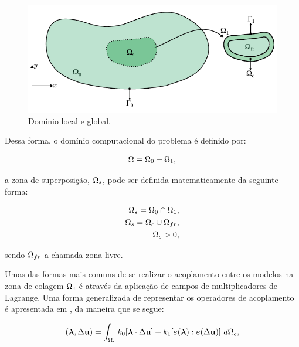 \documentclass[tese_patricia]{subfiles}
\begin{document}
\begin{figure}[htb!]
	\centering 
	\includegraphics[scale=1.0,trim=0cm 0cm 0cm 0.0cm, clip=true]{Imagens/Cap6/dominioArlequin.pdf}	
	\caption{Domínio local e global.}
	\label{fig:DomLocalGlobal}
\end{figure}

Dessa forma, o domínio computacional do problema é definido por:

\begin{align}
	\Omega = \Omega_0 + \Omega_1, 
\end{align}

\noindent a zona de superposição, $\Omega_s$, pode ser definida matematicamente da seguinte forma:

\begin{align}
	\Omega_s = \Omega_0 \cap \Omega_1, \\
	\Omega_s = \Omega_c \cup \Omega_{fr}, \\
	\Omega_s > 0, 
\end{align}

\noindent sendo  $\Omega_{fr}$ a chamada zona livre.

Umas das formas mais comuns de se realizar o acoplamento entre os modelos na zona de colagem $\Omega_c$ é através da aplicação de campos de multiplicadores de Lagrange. Uma forma generalizada de representar os operadores de acoplamento é apresentada em , da maneira que se segue:

\begin{align}
	(\boldsymbol{\lambda},\Delta \mathbf{u}) =  \int_{\Omega_c} k_{0}[\boldsymbol{\lambda} \cdot \Delta \mathbf{u} ] + k_{1}[\bm{\varepsilon} (\boldsymbol{\lambda}) : \bm{\varepsilon} (\Delta \mathbf{u})] \ d\Omega_{c},
\end{align}
\end{document}
